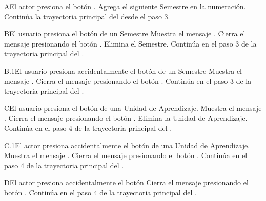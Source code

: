\begin{UCtrayectoriaA}{A}{El actor presiona el botón \IUbutton{+}.}
	\UCpaso Agrega el siguiente Semestre en la numeración.
    \UCpaso Continúa la trayectoria principal del  desde el paso 3.
\end{UCtrayectoriaA}
\begin{UCtrayectoriaA}{B}{El usuario presiona el botón  de un Semestre}
	\UCpaso  Muestra el mensaje .
	\UCpaso[\UCactor] Cierra el mensaje presionando el botón .
	\UCpaso Elimina el Semestre.
    \UCpaso Continúa en el paso 3 de la trayectoria principal del .
\end{UCtrayectoriaA}
\begin{UCtrayectoriaA}{B.1}{El usuario presiona accidentalmente el botón  de un Semestre}
	\UCpaso  Muestra el mensaje .
	\UCpaso[\UCactor] Cierra el mensaje presionando el botón .
    \UCpaso Continúa en el paso 3 de la trayectoria principal del .
\end{UCtrayectoriaA}
\begin{UCtrayectoriaA}{C}{El usuario presiona el botón  de una Unidad de Aprendizaje.}
	\UCpaso  Muestra el mensaje .
	\UCpaso[\UCactor] Cierra el mensaje presionando el botón .
	\UCpaso Elimina la Unidad de Aprendizaje.
    \UCpaso Continúa en el paso 4 de la trayectoria principal del .
\end{UCtrayectoriaA}
\begin{UCtrayectoriaA}{C.1}{El actor presiona accidentalmente el botón  de una Unidad de Aprendizaje.}
	\UCpaso Muestra el mensaje .
	\UCpaso[\UCactor] Cierra el mensaje presionando el botón .
    \UCpaso Continúa en el paso 4 de la trayectoria principal del .
\end{UCtrayectoriaA}
\begin{UCtrayectoriaA}{D}{El actor presiona accidentalmente el botón }
    \UCpaso[\UCactor] Cierra el mensaje presionando el botón .
    \UCpaso Continúa en el paso 4 de la trayectoria principal del .
\end{UCtrayectoriaA}
